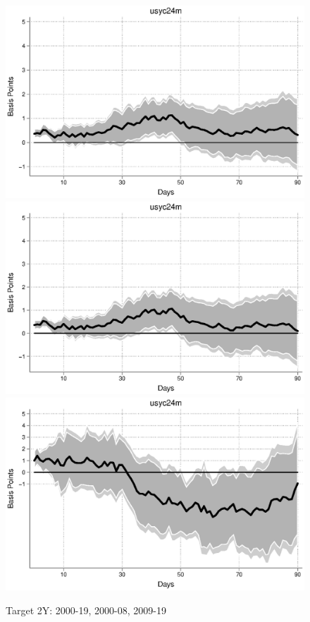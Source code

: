 \documentclass{article}
\begin{document}
\begin{figure}
	\caption{Target 2Y: 2000-19, 2000-08, 2009-19}
	\includegraphics[trim={0cm 0cm 0cm 0cm},clip,height=0.3\textheight,width=1\textwidth]{../LagDep-FX/Target/US/usyc24m00-19target.eps} \\
	\includegraphics[trim={0cm 0cm 0cm 0cm},clip,height=0.3\textheight,width=1\textwidth]{../LagDep-FX/Target/US/usyc24m00-08target.eps} \\
	\includegraphics[trim={0cm 0cm 0cm 0cm},clip,height=0.3\textheight,width=1\textwidth]{../LagDep-FX/Target/US/usyc24m09-19target.eps} \\
\end{figure}
\end{document}
